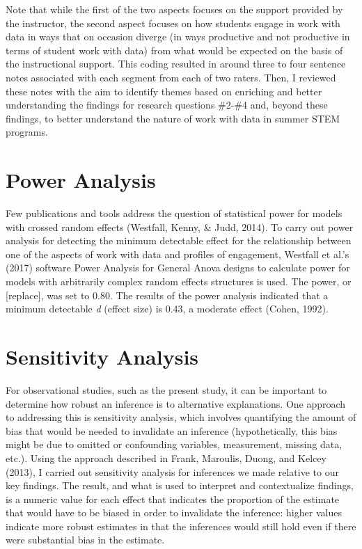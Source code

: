 \documentclass[]{msu-thesis}
\theoremstyle{definition}
\theoremstyle{definition}
\theoremstyle{definition}
\theoremstyle{remark}
\begin{document}
Note that while the first of the two aspects focuses on the support
provided by the instructor, the second aspect focuses on how students
engage in work with data in ways that on occasion diverge (in ways
productive and not productive in terms of student work with data) from
what would be expected on the basis of the instructional support. This
coding resulted in around three to four sentence notes associated with
each segment from each of two raters. Then, I reviewed these notes with
the aim to identify themes based on enriching and better understanding
the findings for research questions \#2-\#4 and, beyond these findings,
to better understand the nature of work with data in summer STEM
programs.

\section{Power Analysis}\label{power-analysis}

Few publications and tools address the question of statistical power for
models with crossed random effects (Westfall, Kenny, \& Judd, 2014). To
carry out power analysis for detecting the minimum detectable effect for
the relationship between one of the aspects of work with data and
profiles of engagement, Westfall et al.'s (2017) software Power Analysis
for General Anova designs to calculate power for models with arbitrarily
complex random effects structures is used. The power, or {[}replace{]},
was set to 0.80. The results of the power analysis indicated that a
minimum detectable \emph{d} (effect size) is 0.43, a moderate effect
(Cohen, 1992).

\section{Sensitivity Analysis}\label{sensitivity-analysis}

For observational studies, such as the present study, it can be
important to determine how robust an inference is to alternative
explanations. One approach to addressing this is sensitivity analysis,
which involves quantifying the amount of bias that would be needed to
invalidate an inference (hypothetically, this bias might be due to
omitted or confounding variables, measurement, missing data, etc.).
Using the approach described in Frank, Maroulis, Duong, and Kelcey
(2013), I carried out sensitivity analysis for inferences we made
relative to our key findings. The result, and what is used to interpret
and contextualize findings, is a numeric value for each effect that
indicates the proportion of the estimate that would have to be biased in
order to invalidate the inference: higher values indicate more robust
estimates in that the inferences would still hold even if there were
substantial bias in the estimate.
\end{document}
